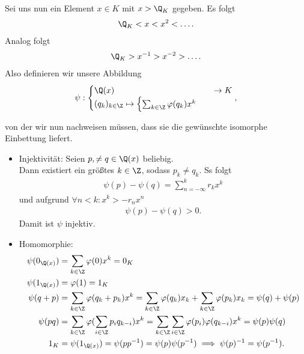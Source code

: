 \begin{solution}
\begin{enumerate}
  Sei uns nun ein Element $x \in K$ mit $x > \Q_K$ gegeben. Es folgt
  \begin{align*}
    \Q_K < x < x^2 < \dots.
  \end{align*}
  Analog folgt
  \begin{align*}
    \Q_K > x^{-1} > x^{-2} > \dots.
  \end{align*}
  Also definieren wir unsere Abbildung
  \begin{align*}
    \psi: \begin{cases}
      \Q(x) &\to K \\
      (q_k)_{k \in \Z} \mapsto
      \begin{cases}
        \sum_{k \in \Z}\varphi(q_k)x^k
      \end{cases}
    \end{cases},
  \end{align*}
\end{enumerate}
von der wir nun nachweisen müssen, dass sie die gewünschte isomorphe Einbettung liefert.
\begin{itemize}
  \item Injektivität: Seien $p, \neq q \in \Q(x)$ beliebig. \\
  Dann existiert ein größtes $k \in \Z$, sodass $p_k \neq q_k$. Ss folgt
  \begin{align*}
    \psi(p) - \psi(q) = \sum_{n = -\infty}^kr_kx^k
  \end{align*}
  und aufgrund $\forall n < k: x^k > -r_nx^n$
  \begin{align*}
    \psi(p) - \psi(q) > 0.
  \end{align*}
  Damit ist $\psi$ injektiv.
  \item Homomorphie:
  \begin{align*}
    \psi(0_{\Q(x)}) &= \sum_{k \in \Z}\varphi(0)x^k = 0_K \\
    \psi(1_{\Q(x)}) &= \varphi(1) = 1_K \\
    \psi(q + p) &= \sum_{k \in \Z}\varphi(q_k + p_k)x^k =
    \sum_{k \in \Z}\varphi(q_k)x_k + \sum_{k \in \Z}\varphi(p_k)x_k
    = \psi(q) + \psi(p) \\
    \psi(pq) &= \sum_{k \in \Z}\varphi(\sum_{i \in \Z}p_iq_{k-i})x^k =
    \sum_{k \in \Z}\sum_{i \in \Z}\varphi(p_i)\varphi(q_{k-i})x^k
    = \psi(p)\psi(q) \\
    1_K &= \psi(1_{\Q(x)}) = \psi(pp^{-1}) = \psi(p)\psi(p^{-1})
    \implies \psi(p)^{-1} = \psi(p^{-1}).
  \end{align*}
\end{itemize}
\end{solution}
